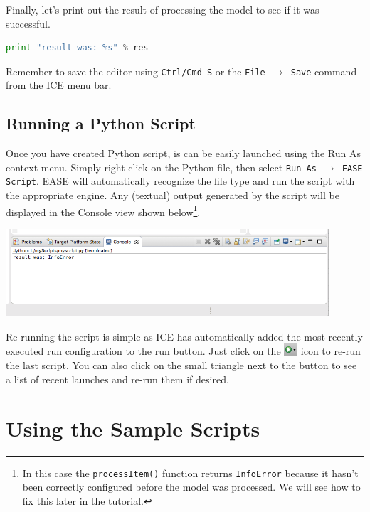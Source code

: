 \documentclass{article}
\begin{document}
Finally, let's print out the result of processing the model to see if it was
successful.

\begin{lstlisting}[frame=single,language=Python]
print "result was: %s" % res
\end{lstlisting}

Remember to save the editor using \texttt{Ctrl/Cmd-S} or the \texttt{File
$\rightarrow$ Save} command from the ICE menu bar.

\subsection{Running a Python Script}

Once you have created Python script, is can be easily launched using the Run As
context menu. Simply right-click on the Python file, then select \texttt{Run As
$\rightarrow$ EASE Script}. EASE will automatically recognize the file type and
run the script with the appropriate engine. Any (textual) output generated by
the script will be displayed in the Console view shown below\footnote{
In this case the \texttt{processItem()} function returns \texttt{InfoError}
because it hasn't been correctly configured before the model was processed. We
will see how to fix this later in the tutorial.}.

\begin{center}
\includegraphics[width=12cm]{images/console}
\end{center}

Re-running the script is simple as ICE has automatically added the most recently
executed run configuration to the run button. Just click on the
\includegraphics[width=0.5cm]{images/runbutton} icon to re-run the last script.
You can also click on the small triangle next to the button to see a list of 
recent launches and re-run them if desired. 

\section{Using the Sample Scripts}
\end{document}
